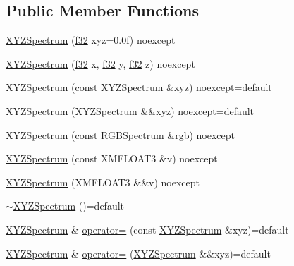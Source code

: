\subsection*{Public Member Functions}
\begin{DoxyCompactItemize}
\item 
\hyperlink{structmage_1_1_x_y_z_spectrum_aada5f54df6899b1589237fed025e305e}{X\+Y\+Z\+Spectrum} (\hyperlink{namespacemage_a6a44ad388483959dc4dff9f2aef91431}{f32} xyz=0.\+0f) noexcept
\item 
\hyperlink{structmage_1_1_x_y_z_spectrum_a2bc776f3ee380d040f66ca3b8619d724}{X\+Y\+Z\+Spectrum} (\hyperlink{namespacemage_a6a44ad388483959dc4dff9f2aef91431}{f32} x, \hyperlink{namespacemage_a6a44ad388483959dc4dff9f2aef91431}{f32} y, \hyperlink{namespacemage_a6a44ad388483959dc4dff9f2aef91431}{f32} z) noexcept
\item 
\hyperlink{structmage_1_1_x_y_z_spectrum_a5ae7302e6a0a9ffb362f40c462c87fba}{X\+Y\+Z\+Spectrum} (const \hyperlink{structmage_1_1_x_y_z_spectrum}{X\+Y\+Z\+Spectrum} \&xyz) noexcept=default
\item 
\hyperlink{structmage_1_1_x_y_z_spectrum_a17d10e71ad586928af9005b8b63edafc}{X\+Y\+Z\+Spectrum} (\hyperlink{structmage_1_1_x_y_z_spectrum}{X\+Y\+Z\+Spectrum} \&\&xyz) noexcept=default
\item 
\hyperlink{structmage_1_1_x_y_z_spectrum_a7498fec029d8e76e7b666116ac6f2cc8}{X\+Y\+Z\+Spectrum} (const \hyperlink{structmage_1_1_r_g_b_spectrum}{R\+G\+B\+Spectrum} \&rgb) noexcept
\item 
\hyperlink{structmage_1_1_x_y_z_spectrum_a3a89ed028f199098a6b434fbc1daf943}{X\+Y\+Z\+Spectrum} (const X\+M\+F\+L\+O\+A\+T3 \&v) noexcept
\item 
\hyperlink{structmage_1_1_x_y_z_spectrum_a5e76024eef44618dda395bfc53393728}{X\+Y\+Z\+Spectrum} (X\+M\+F\+L\+O\+A\+T3 \&\&v) noexcept
\item 
\hyperlink{structmage_1_1_x_y_z_spectrum_af3a318ebdb1eb1e47cd81707850049a7}{$\sim$\+X\+Y\+Z\+Spectrum} ()=default
\item 
\hyperlink{structmage_1_1_x_y_z_spectrum}{X\+Y\+Z\+Spectrum} \& \hyperlink{structmage_1_1_x_y_z_spectrum_afb9ded2a6c69514b9853f753c5f94f98}{operator=} (const \hyperlink{structmage_1_1_x_y_z_spectrum}{X\+Y\+Z\+Spectrum} \&xyz)=default
\item 
\hyperlink{structmage_1_1_x_y_z_spectrum}{X\+Y\+Z\+Spectrum} \& \hyperlink{structmage_1_1_x_y_z_spectrum_a5191cffff5e1560164a34d43aa72441b}{operator=} (\hyperlink{structmage_1_1_x_y_z_spectrum}{X\+Y\+Z\+Spectrum} \&\&xyz)=default
\end{DoxyCompactItemize}


